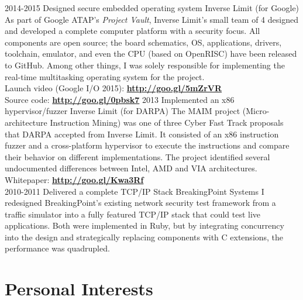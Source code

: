 \documentclass[]{friggeri-cv}
\begin{document}
\begin{entrylist}
  \entry
      {2014-2015}
      {Designed secure embedded operating system}
      {Inverse Limit (for Google)}
      {
        As part of Google ATAP's \emph{Project Vault}, Inverse Limit's small team of 4 designed and developed a complete computer platform with a security focus. All components are open source; the board schematics, OS, applications, drivers, toolchain, emulator, and even the CPU (based on OpenRISC) have been released to GitHub. Among other things, I was solely responsible for implementing the real-time multitasking operating system for the project.\\
%        

        Launch video (Google I/O 2015): \hfill \href{http://goo.gl/5mZrVR}{\textbf{http://goo.gl/5mZrVR}}\\
        Source code: \hfill \href{http://goo.gl/0pbsk7}{\textbf{http://goo.gl/0pbsk7}}
      }
  \entry
      {2013}
      {Implemented an x86 hypervisor/fuzzer}
      {Inverse Limit (for DARPA)}
      {The MAIM project (Micro-architecture Instruction Mining) was one of three Cyber Fast Track proposals that DARPA accepted from Inverse Limit. It consisted of an x86 instruction fuzzer and a cross-platform hypervisor to execute the instructions and compare their behavior on different implementations. The project identified several undocumented differences between Intel, AMD and VIA architectures.\\

        Whitepaper: \hfill \href{http://goo.gl/Kwa3Rf}{\textbf{http://goo.gl/Kwa3Rf}}\\
      }
  \entry
      {2010-2011}
      {Delivered a complete TCP/IP Stack}
      {BreakingPoint Systems}
      {I redesigned BreakingPoint's existing network security test framework from a traffic simulator into a fully featured TCP/IP stack that could test live applications. Both were implemented in Ruby, but by integrating concurrency into the design and strategically replacing components with C extensions, the performance was quadrupled.}
\end{entrylist}
\section{Personal Interests}
\end{document}
